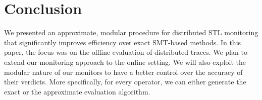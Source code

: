 \section{Conclusion} \label{sec:conclusion}



\alert{
We presented an approximate, modular procedure for distributed STL monitoring that significantly improves efficiency over exact SMT-based methods.
In this paper, the focus was on the offline evaluation of distributed traces.
We plan to extend our monitoring approach to the online setting.
We will also exploit the modular nature of our monitors to have a better control over the accuracy of their verdicts.
More specifically, for every operator, we can either generate the exact or the approximate evaluation algorithm.
}